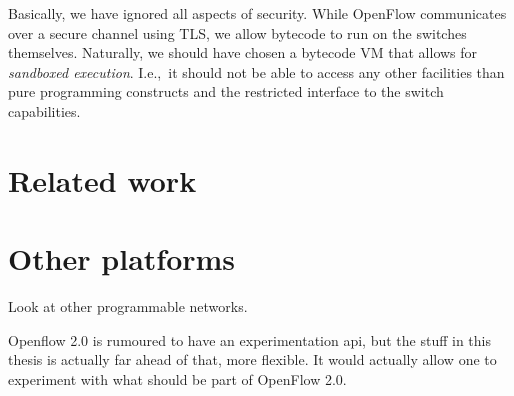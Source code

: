 Basically, we have ignored all aspects of security.  While OpenFlow
communicates over a secure channel using \ac{TLS}, we
allow bytecode to run on the switches themselves.  Naturally, we should have
chosen a bytecode \acs{VM} that allows for \textit{sandboxed execution}.
I.e.,~it should not be able to access any other facilities than pure
programming constructs and the restricted interface to the switch
capabilities.


\section{Related work}


\section{Other platforms}

Look at other programmable networks.

Openflow 2.0 is rumoured to have an experimentation api, but the stuff in
this thesis is actually far ahead of that, more flexible.
It would actually allow one to experiment with what should be part of
OpenFlow 2.0.
